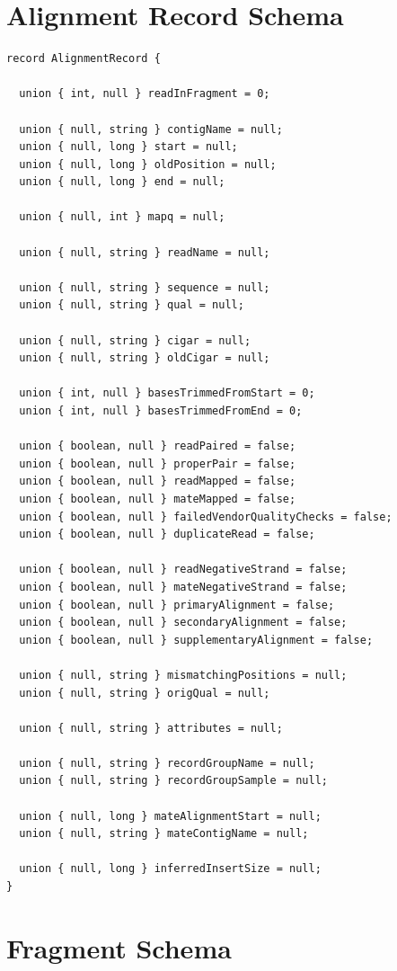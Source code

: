 \documentclass[phd]{ucbthesis}
\begin{document}
\section{Alignment Record Schema}
\label{sec:alignment-record}

\begin{lstlisting}[caption={ADAM} read schema]
record AlignmentRecord {
 
  union { int, null } readInFragment = 0;

  union { null, string } contigName = null;
  union { null, long } start = null;
  union { null, long } oldPosition = null;
  union { null, long } end = null;

  union { null, int } mapq = null;

  union { null, string } readName = null;

  union { null, string } sequence = null;
  union { null, string } qual = null;

  union { null, string } cigar = null;
  union { null, string } oldCigar = null;

  union { int, null } basesTrimmedFromStart = 0;
  union { int, null } basesTrimmedFromEnd = 0;

  union { boolean, null } readPaired = false;
  union { boolean, null } properPair = false;
  union { boolean, null } readMapped = false;
  union { boolean, null } mateMapped = false;
  union { boolean, null } failedVendorQualityChecks = false;
  union { boolean, null } duplicateRead = false;

  union { boolean, null } readNegativeStrand = false;
  union { boolean, null } mateNegativeStrand = false;
  union { boolean, null } primaryAlignment = false;
  union { boolean, null } secondaryAlignment = false;
  union { boolean, null } supplementaryAlignment = false;

  union { null, string } mismatchingPositions = null;
  union { null, string } origQual = null;

  union { null, string } attributes = null;

  union { null, string } recordGroupName = null;
  union { null, string } recordGroupSample = null;

  union { null, long } mateAlignmentStart = null;
  union { null, string } mateContigName = null;

  union { null, long } inferredInsertSize = null;
}
\end{lstlisting}

\section{Fragment Schema}
\label{sec:fragment}
\end{document}
